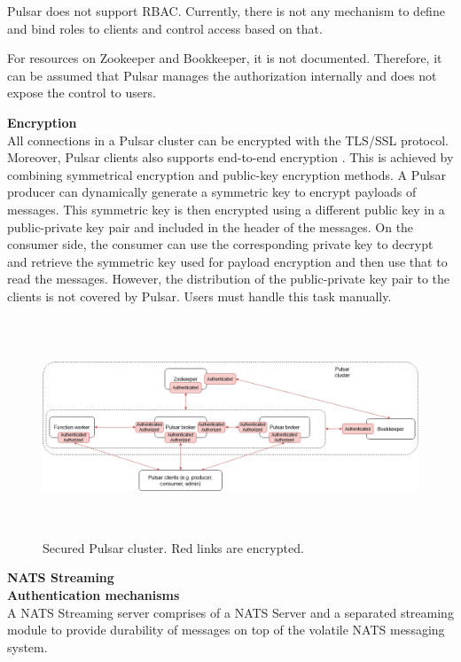 Pulsar does not support RBAC. Currently, there is not any mechanism to define and bind roles to clients and control access based on that.

For resources on Zookeeper and Bookkeeper, it is not documented. Therefore, it can be assumed that Pulsar manages the authorization internally and does not expose the control to users. 

\textbf{Encryption}\\
All connections in a Pulsar cluster can be encrypted with the TLS/SSL protocol. Moreover, Pulsar clients also supports end-to-end encryption \cite{pulsarsecurity}. This is achieved by combining symmetrical encryption and public-key encryption methods. A Pulsar producer can dynamically generate a symmetric key to encrypt payloads of messages. This symmetric key is then encrypted using a different public key in a public-private key pair and included in the header of the messages. On the consumer side, the consumer can use the corresponding private key to decrypt and retrieve the symmetric key used for payload encryption and then use that to read the messages. However, the distribution of the public-private key pair to the clients is not covered by Pulsar. Users must handle this task manually. 

\begin{figure}[h]
	\centering
	\includegraphics[width=15cm,height=6.5cm]{images/security-pulsar.png}
	\caption{Secured Pulsar cluster. Red links are encrypted.}
	\label{fig:securitypulsar}
\end{figure} 

\large \textbf{NATS Streaming}\\
\normalsize
\textbf{Authentication mechanisms}\\
A NATS Streaming server comprises of a NATS Server and a separated streaming module to provide durability of messages on top of the volatile NATS messaging system. 

